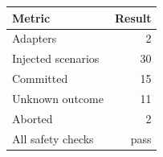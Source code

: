 \begin{tabular}{lr}
\toprule
Metric & Result \\
\midrule
Adapters & 2 \\
Injected scenarios & 30 \\
Committed & 15 \\
Unknown outcome & 11 \\
Aborted & 2 \\
All safety checks & pass \\
\bottomrule
\end{tabular}
